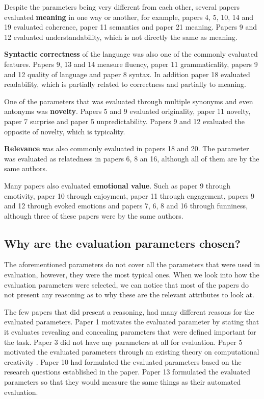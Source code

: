 \documentclass[11pt,a4paper]{article}
\begin{document}
Despite the parameters being very different from each other, several papers evaluated \textbf{meaning} in one way or another, for example, papers 4, 5, 10, 14 and 19 evaluated coherence, paper 11 semantics and paper 21 meaning.  Papers 9 and 12 evaluated understandability, which is not directly the same as meaning.

\textbf{Syntactic correctness} of the language was also one of the commonly evaluated features. Papers 9, 13 and 14 measure fluency, paper 11 grammaticality, papers 9 and 12 quality of language and paper 8 syntax. In addition paper 18 evaluated readability, which is partially related to correctness and partially to meaning.

One of the parameters that was evaluated through multiple synonyms and even antonyms was \textbf{novelty}. Papers 5 and 9 evaluated originality, paper 11 novelty, paper 7 surprise and paper 5 unpredictability. Papers 9 and 12 evaluated the opposite of novelty, which is typicality.

\textbf{Relevance} was also commonly evaluated in papers 18 and 20. The parameter was evaluated as relatedness in papers 6, 8 an 16, although all of them are by the same authors.

Many papers also evaluated \textbf{emotional value}. Such as paper 9 through emotivity, paper 10 through enjoyment, paper 11 through engagement, papers 9 and 12 through evoked emotions and papers 7, 6, 8 and 16 through funniness, although three of these papers were by the same authors.

\subsection{Why are the evaluation parameters chosen?}

The aforementioned parameters do not cover all the parameters that were used in evaluation, however, they were the most typical ones. When we look into how the evaluation parameters were selected, we can notice that most of the papers do not present any reasoning as to why these are the relevant attributes to look at. 

The few papers that did present a reasoning, had many different reasons for the evaluated parameters. Paper 1 motivates the evaluated parameter by stating that it evaluates revealing and concealing parameters that were defined important for the task. Paper 3 did not have any parameters at all for evaluation. Paper 5 motivated the evaluated parameters through an existing theory on computational creativity \cite{boden2007creativity}. Paper 10 had formulated the evaluated parameters based on the research questions established in the paper. Paper 13 formulated the evaluated parameters so that they would measure the same things as their automated evaluation.
\end{document}
